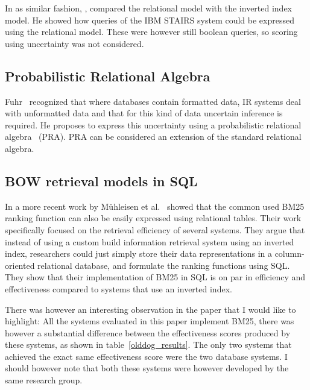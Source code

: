 In as similar fashion, \cite{macleod}, compared the relational model with the inverted index model. He showed how queries of the IBM STAIRS system could be expressed using the relational model. These were however still boolean queries, so scoring using uncertainty was not considered. 

\subsection{Probabilistic Relational Algebra}
Fuhr~\cite{fuhr1996probabilistic} recognized that where databases contain formatted data, IR systems deal with unformatted data and that for this kind of data uncertain inference is required. He proposes to express this uncertainty using a probabilistic relational algebra~\cite{fuhr-pra} (PRA). 
PRA can be considered an extension of the standard relational algebra. 




\subsection{BOW retrieval models in SQL}

In a more recent work by M\"{u}hleisen et al.~\cite{OldDog} showed that the common used BM25 ranking function can also be easily expressed using relational tables. Their work specifically focused on the retrieval efficiency of several systems. They argue that instead of using a custom build information retrieval system using an inverted index, researchers could just simply store their data representations in a column-oriented relational database, and formulate the ranking functions using SQL. They show that their implementation of BM25 in SQL is on par in efficiency and effectiveness compared to systems that use an inverted index. 

There was however an interesting observation in the paper that I would like to highlight: All the systems evaluated in this paper implement BM25, there was however a substantial difference between the effectiveness scores produced by these systems, as shown in table~\ref{olddog_results}. The only two systems that achieved the exact same effectiveness score were the two database systems. I should however note that both these systems were however developed by the same research group.

